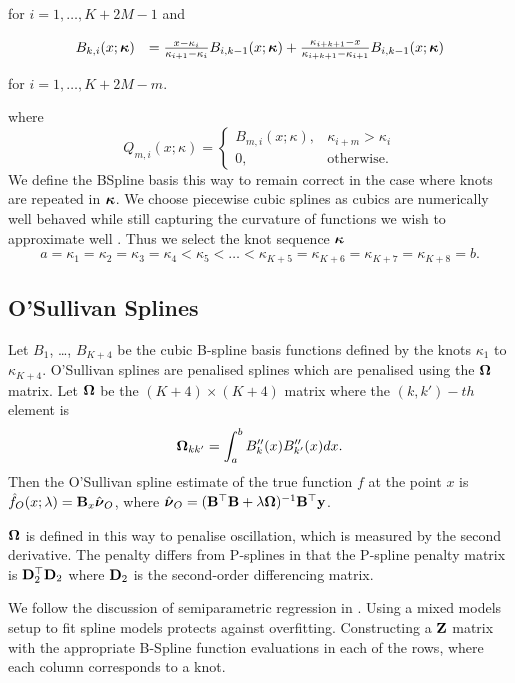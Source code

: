 \noindent for $i = 1, \ldots, K + 2M -1$ and

$$
\begin{array}{rl}
	B_{k, i}(x; {\boldsymbol \kappa}) &= \frac{x - \kappa_i}{\kappa_{i + 1} - \kappa_i} B_{i, k-1} (x; {\boldsymbol \kappa}) + 
										\frac{\kappa_{i + k + 1} - x}{\kappa_{i + k + 1} - \kappa_{i + 1}} B_{i, k-1} (x; {\boldsymbol \kappa})
\end{array}
$$

\noindent for $i = 1, \ldots, K + 2 M - m$.

\noindent where
$$
Q_{m, i}(x; \kappa) =
\begin{cases}
B_{m, i}(x; \kappa),& \kappa_{i + m} > \kappa_i \\
0, & \text{otherwise}.
\end{cases}
$$
We define the BSpline basis this way to remain correct in the case where knots are repeated in ${\boldsymbol \kappa}$. We
choose piecewise cubic splines as cubics are numerically well behaved while still capturing the curvature of
functions we wish to approximate well \citep{Press:2007:NRE:1403886}. Thus we select the knot sequence
${\boldsymbol \kappa}$
$$
a = \kappa_1 = \kappa_2 = \kappa_3 = \kappa_4 < \kappa_5 < \ldots < \kappa_{K+5} = \kappa_{K+6} = \kappa_{K+7} = \kappa_{K+8} = b.
$$

\subsection{O'Sullivan Splines}

Let $B_1$, \ldots, $B_{K+4}$ be the cubic B-spline basis functions defined by the knots $\kappa_1$ to
$\kappa_{K+4}$. O'Sullivan splines are penalised splines which are penalised using the ${\boldsymbol \Omega}$ matrix.
Let ${\boldsymbol \Omega}$ be the $(K+4) \times (K+4)$ matrix where the $(k, k')-th$ element is
\[
	{\boldsymbol \Omega}_{k k'} = \int_a^b B''_k(x) B''_{k'}(x) dx.
\]
Then the O'Sullivan spline estimate of the true function $f$ at the point $x$ is
$\hat{f}_O(x; \lambda) = {\bf B}_x \hat{{\boldsymbol \nu}}_O$, where
$\hat{{\boldsymbol \nu}}_O = ({\bf B}^\top {\bf B} + \lambda {\boldsymbol\Omega})^{-1} {\bf B}^\top {\bf y}$.

${\boldsymbol \Omega}$ is defined in this way to penalise oscillation, which is measured by the second derivative.
The penalty differs from P-splines in that the P-spline penalty matrix is ${\bf D}_2^\top {\bf D}_2$ where ${\bf D}_2$ is
the second-order differencing matrix.

We follow the discussion of semiparametric regression in \cite{ruppert_wand_carroll_2003}.
Using a mixed models setup to fit spline models protects against overfitting.
Constructing a ${\bf Z}$ matrix with the appropriate B-Spline function evaluations in each of the rows, where
each column corresponds to a knot.

